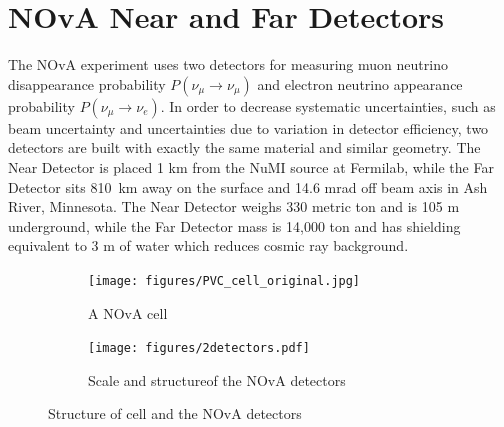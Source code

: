 \section{NOvA Near and Far Detectors}
The NOvA experiment uses two detectors for measuring muon neutrino disappearance probability 
$P(\nu_\mu \rightarrow \nu_\mu)$ and electron neutrino appearance probability $P(\nu_\mu \rightarrow \nu_e)$. 
In order to decrease systematic uncertainties, such as beam uncertainty and uncertainties due to variation
in detector efficiency, two detectors are built with exactly the same material and 
similar geometry. The Near Detector is placed 1 km from the NuMI source at Fermilab, while the 
Far Detector sits 810~km away on the surface and 14.6 mrad off beam axis in Ash River, Minnesota. 
The Near Detector weighs 330 metric ton and is 105 m underground, while the Far Detector mass is 
14,000 ton and has shielding equivalent to 3 m of water which reduces cosmic ray background.
\begin{figure}
\begin{subfigure}{.2\textwidth}
  \centering
  \texttt{[image: figures/PVC\_cell\_original.jpg]}
  \caption{A NOvA cell}
  \label{fig:cell}
\end{subfigure}%
\begin{subfigure}{.8\textwidth}
  \centering
  \texttt{[image: figures/2detectors.pdf]}
  \caption{Scale and structureof the NOvA detectors}
  \label{fig:2detectors}
\end{subfigure}
\caption{Structure of cell and the NOvA detectors}
\label{fig:cell_detectors}
\end{figure}

